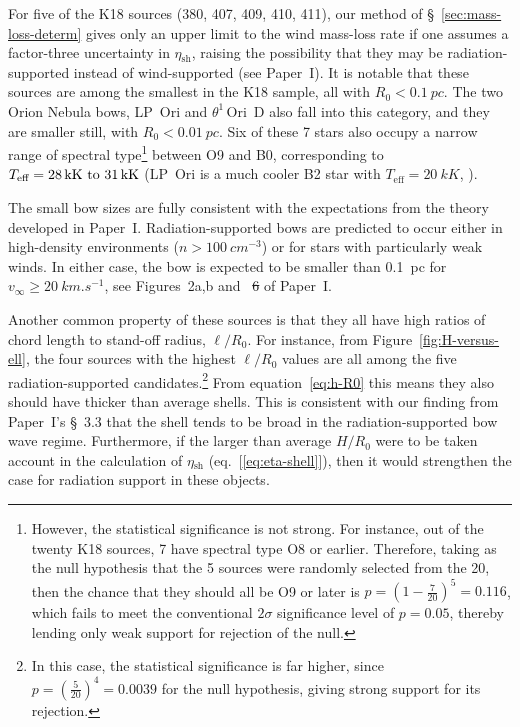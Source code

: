 \documentclass[useAMS, usenatbib, a4paper]{mnras}
\newcommand{\thD}{\(\theta^1\)\,Ori~D}
\newcommand\shell{\ensuremath{_{\text{sh}}}}
\providecommand{\DIFaddtex}[1]{{\protect\color{red!70!black}\uwave{#1}}} %
\providecommand{\DIFdeltex}[1]{{\protect\color{white!50!black} \ifmmode\cancel{#1}\else\sout{#1}\fi}} %
\providecommand{\DIFaddbegin}{} %
\providecommand{\DIFaddend}{} %
\providecommand{\DIFdelbegin}{} %
\providecommand{\DIFdelend}{} %
\providecommand{\DIFadd}[1]{\texorpdfstring{\DIFaddtex{#1}}{#1}} %
\providecommand{\DIFdel}[1]{\texorpdfstring{\DIFdeltex{#1}}{}} %
\begin{document}
For five of the K18 sources (380, 407, 409, 410, 411), our method of
\S~\ref{sec:mass-loss-determ} gives only an upper limit to the wind
mass-loss rate if one assumes a factor-three uncertainty in
\(\eta\shell\), raising the possibility that they may be
radiation-supported instead of wind-supported (see Paper~I).  It is
notable that these sources are among the smallest in the K18 sample,
all with \(R_0 < \SI{0.1}{pc}\).  The two Orion Nebula bows, LP~Ori
and \thD{} also fall into this category, and they are smaller still,
with \(R_0 < \SI{0.01}{pc}\).  Six of these 7 stars also occupy a
narrow range of spectral type\footnote{%
  However, the statistical significance is not strong.  For
  instance, out of the twenty K18 sources, 7 have spectral type O8 or
  earlier.  Therefore, taking as the null hypothesis that the 5
  sources were randomly selected from the 20, then the chance that
  they should all be O9 or later is
  \(p = (1 - \frac{7}{20})^5 = 0.116\), which fails to meet the
  conventional \(2\sigma\) significance level of \(p = 0.05\),
  thereby lending only weak support for rejection of the null.} %
between O9 and B0, corresponding to
\(T_{\text{eff}} = \text{\SIrange{28}{31}{kK}}\) (LP~Ori is a much
cooler B2 star with \(T_{\text{eff}} = \SI{20}{kK}\),
\citealp{Petit:2008a, Alecian:2013a}).

The small bow sizes are fully consistent with the expectations from
the theory developed in Paper~I.  Radiation-supported bows are predicted
to occur either in high-density environments
(\(n > \SI{100}{cm^{-3}}\)) or for stars with particularly weak winds.
In either case, the bow is expected to be smaller than \SI{0.1}{pc}
for \DIFdelbegin \DIFdel{\(v_\infty \ge \SI{20}{km.s^{-1}}\)}\DIFdelend \DIFaddbegin \DIFadd{\(v \ge \SI{20}{km.s^{-1}}\)}\DIFaddend , see Figures~2a,b and~\DIFdelbegin \DIFdel{6 }\DIFdelend \DIFaddbegin \DIFadd{8 }\DIFaddend of
Paper~I.\@

Another common property of these sources is that they all have high
ratios of chord length to stand-off radius, \(\ell/R_0\).  For
instance, from Figure~\ref{fig:H-versus-ell}, the four sources with
the highest \(\ell/R_0\) values are all among the five
radiation-supported candidates.\footnote{%
  In this case, the statistical significance is far higher, since
  \(p = (\frac{5}{20})^4 = 0.0039\) for the null hypothesis, giving
  strong support for its rejection.}  From equation~\eqref{eq:h-R0}
this means they also should have thicker than average shells.  This is
consistent with our finding from Paper~I's \S~3.3 that the shell tends
to be broad in the radiation-supported bow wave regime.  Furthermore,
if the larger than average \(H/R_0\) were to be taken account in the
calculation of \(\eta\shell\) (eq.~[\ref{eq:eta-shell}]), then it
would strengthen the case for radiation support in these objects.
\end{document}
